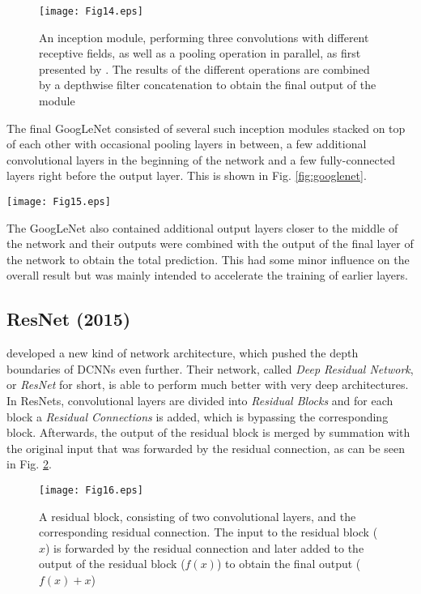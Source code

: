 \documentclass[conference]{IEEEtran}
\begin{document}
\begin{figure}
\texttt{[image: Fig14.eps]}
\caption{An inception module, performing three convolutions with different receptive fields, as well as a pooling operation in parallel, as first presented by \cite{GoogLeNet}. The results of the different operations are combined by a depthwise filter concatenation to obtain the final output of the module}
\label{fig:inception_module}
\end{figure}

The final GoogLeNet consisted of several such inception modules stacked on top of each other with occasional pooling layers in between, a few additional convolutional layers in the beginning of the network and a few fully-connected layers right before the output layer. This is shown in Fig. \ref{fig:googlenet}.

\begin{figure*}
\texttt{[image: Fig15.eps]}
\caption{The GoogLeNet, containing nine inception modules, five pooling layers, three convolutional layers after the input layer, as well as a fully-connected layer before the output layer}
\label{fig:googlenet}
\end{figure*}

The GoogLeNet also contained additional output layers closer to the middle of the network and their outputs were combined with the output of the final layer of the network to obtain the total prediction. This had some minor influence on the overall result but was mainly intended to accelerate the training of earlier layers.


\subsection{ResNet (2015)}\label{subsec:2015}
\cite{ResNet} developed a new kind of network architecture, which pushed the depth boundaries of DCNNs even further. Their network, called \emph{Deep Residual Network}, or \emph{ResNet} for short, is able to perform much better with very deep architectures. In ResNets, convolutional layers are divided into \emph{Residual Blocks} and for each block a \emph{Residual Connections} is added, which is bypassing the corresponding block. Afterwards, the output of the residual block is merged by summation with the original input that was forwarded by the residual connection, as can be seen in Fig. \ref{fig:resnetblock}. 

\begin{figure}
\texttt{[image: Fig16.eps]}
\caption{A residual block, consisting of two convolutional layers, and the corresponding residual connection. The input to the residual block ($x$) is forwarded by the residual connection and later added to the output of the residual block ($f(x)$) to obtain the final output ($f(x)+x$)}
\label{fig:resnetblock}
\end{figure}
\end{document}
